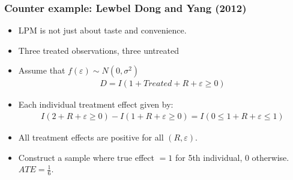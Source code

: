 \documentclass[11pt,dvipsnames,table,aspectratio=169]{beamer}
\begin{document}
\begin{frame}
\frametitle{Counter example: Lewbel Dong and Yang (2012)}
\begin{itemize}
\item LPM is not just about taste and convenience.
\item Three treated observations, three untreated %
\item Assume that $f(\varepsilon) \sim N(0,\sigma^2)$
\begin{eqnarray*}
D = I ( 1 + Treated + R + \varepsilon \geq 0 ) 
\end{eqnarray*}
\item Each individual treatment effect given by:
\begin{eqnarray*}
 I ( 2 + R + \varepsilon \geq 0 ) -  I ( 1 + R + \varepsilon \geq 0 )  =  I ( 0 \leq 1 + R + \varepsilon \leq 1 ) 
\end{eqnarray*}
\item All treatment effects are positive for all $(R,\varepsilon)$.
\item Construct a sample where true effect $=1$ for 5th individual, 0 otherwise. $ATE= \frac{1}{6}$.
\end{itemize}
\end{frame}
\end{document}
